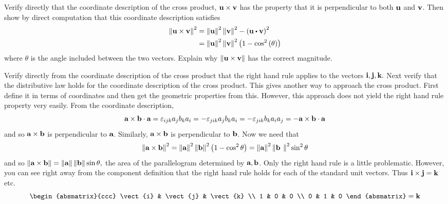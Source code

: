 \begin{enumialphparenastyle}
\begin{ex} Verify directly that the coordinate description of the cross product, 
$\mbox{\bf u}\times \mbox{\bf v}$ has the property that it is perpendicular to both 
$\mbox{\bf u}$ and $\mbox{\bf v}$. Then show by direct computation that this
coordinate description satisfies
\begin{align*}
\norm{\vect{u}\times \vect{v}} ^{2}& =\norm{\vect{u}
} ^{2}\norm{\vect{v}} ^{2}-\tup{\vect{u}\dotprod \vect{v}} ^{2} \\
& =\norm{\vect{u}} ^{2}\norm{\vect{v}}
^{2}\tup{1-\cos ^{2}\tup{\theta } }
\end{align*}
where $\theta $ is the angle included between the two vectors. Explain why 
$\left\|\mbox{\bf u}\times \mbox{\bf v}\right\| $ has the correct magnitude.
\begin{sol}
Verify directly from the coordinate description of the cross product that the right hand rule applies to the vectors $\mbox{\bf i},\mbox{\bf j},\mbox{\bf k}.$ Next verify that the
distributive law holds for the coordinate description of the cross product.
This gives another way to approach the cross product. First define it in
terms of coordinates and then get the geometric properties from this.
However, this approach does not yield the right hand rule property very
easily. From the coordinate description,
\[
\mbox{\bf a}\times \mbox{\bf b}\cdot \mbox{\bf a}=\varepsilon _{ijk}a_{j}b_{k}a_{i}=-\varepsilon
_{jik}a_{j}b_{k}a_{i}=-\varepsilon _{jik}b_{k}a_{i}a_{j}=-\mbox{\bf a}\times
\mbox{\bf b}\cdot \mbox{\bf a}
\]
and so $\mbox{\bf a}\times \mbox{\bf b}$ is perpendicular to $\mbox{\bf a}$. Similarly, $
\mbox{\bf a}\times \mbox{\bf b}$ is perpendicular to $\mbox{\bf b}$. Now we need that 
\[
\left\|\mbox{\bf a}\times \mbox{\bf b}\right\| ^{2}=\left\|\mbox{\bf a}
\right\| ^{2}\left\|\mbox{\bf b}\right\| ^{2}\left(1-\cos
^{2}\theta \right) =\left\|\mbox{\bf a}\right\| ^{2}\left\|\mbox{\bf b
}\right\| ^{2}\sin ^{2}\theta
\]
and so $\left\|\mbox{\bf a}\times \mbox{\bf b}\right\| =\left\|\mbox{\bf a}
\right\| \left\|\mbox{\bf b}\right\| \sin \theta ,$ the area of the
parallelogram determined by $\mbox{\bf a},\mbox{\bf b}$. Only the right hand rule is a
little problematic. However, you can see right away from the component
definition that the right hand rule holds for each of the standard unit
vectors. Thus $\mbox{\bf i}\times \mbox{\bf j}=\mbox{\bf k}$ etc.
\[
\begin{absmatrix}{ccc}
\vect{i} & \vect{j} & \vect{k} \\
1 & 0 & 0 \\
0 & 1 & 0
\end{absmatrix}=\vect{k}
\]
\end{sol}
\end{ex}


\end{enumialphparenastyle}
